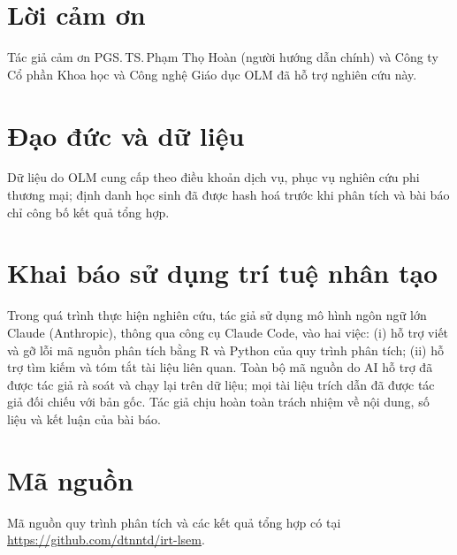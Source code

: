 
\section*{Lời cảm ơn}
\label{sec:ack}

{\fontsize{10}{12}\selectfont
Tác giả cảm ơn PGS.\,TS.\,Phạm Thọ Hoàn (người hướng dẫn chính) và Công ty Cổ phần Khoa học và Công nghệ Giáo dục OLM đã hỗ trợ nghiên cứu này.
\par}

\section*{Đạo đức và dữ liệu}

{\fontsize{10}{12}\selectfont
\noindent Dữ liệu do OLM cung cấp theo điều khoản dịch vụ, phục vụ nghiên cứu phi thương mại; định danh học sinh đã được hash hoá trước khi phân tích và bài báo chỉ công bố kết quả tổng hợp.
\par}

\section*{Khai báo sử dụng trí tuệ nhân tạo}

{\fontsize{10}{12}\selectfont
\noindent Trong quá trình thực hiện nghiên cứu, tác giả sử dụng mô hình ngôn ngữ lớn Claude (Anthropic), thông qua công cụ Claude Code, vào hai việc: (i) hỗ trợ viết và gỡ lỗi mã nguồn phân tích bằng R và Python của quy trình phân tích; (ii) hỗ trợ tìm kiếm và tóm tắt tài liệu liên quan. Toàn bộ mã nguồn do AI hỗ trợ đã được tác giả rà soát và chạy lại trên dữ liệu; mọi tài liệu trích dẫn đã được tác giả đối chiếu với bản gốc. Tác giả chịu hoàn toàn trách nhiệm về nội dung, số liệu và kết luận của bài báo.
\par}

\section*{Mã nguồn}

{\fontsize{10}{12}\selectfont
\noindent Mã nguồn quy trình phân tích và các kết quả tổng hợp có tại \url{https://github.com/dtnntd/irt-lsem}.
\par}
